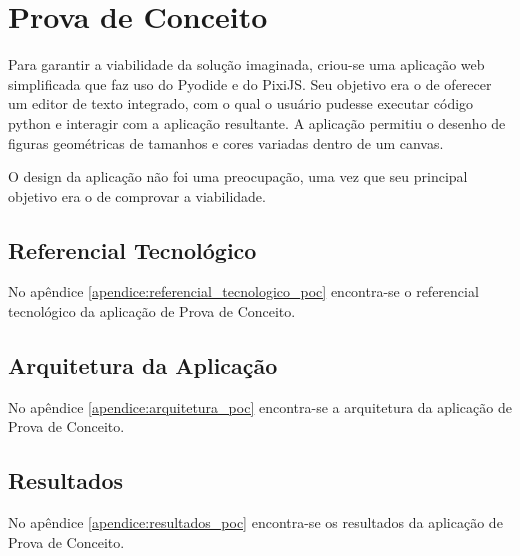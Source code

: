 \section{Prova de Conceito}

Para garantir a viabilidade da solução imaginada, criou-se uma aplicação web simplificada que faz uso do Pyodide e do PixiJS. Seu objetivo era o de oferecer um editor de texto integrado, com o qual o usuário pudesse executar código python e interagir com a aplicação resultante. A aplicação permitiu o desenho de figuras geométricas de tamanhos e cores variadas dentro de um canvas.

O design da aplicação não foi uma preocupação, uma vez que seu principal objetivo era o de comprovar a viabilidade.

\subsection{Referencial Tecnológico}

No apêndice \ref{apendice:referencial_tecnologico_poc} encontra-se o referencial tecnológico da aplicação de Prova de Conceito.

\subsection{Arquitetura da Aplicação}

No apêndice \ref{apendice:arquitetura_poc} encontra-se a arquitetura da aplicação de Prova de Conceito.

\subsection{Resultados}

No apêndice \ref{apendice:resultados_poc} encontra-se os resultados da aplicação de Prova de Conceito.

